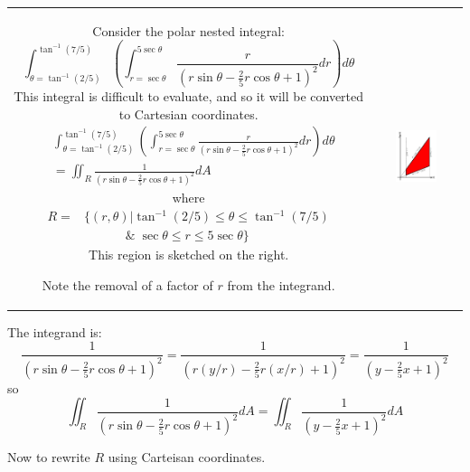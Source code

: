 \documentclass{article}
\begin{document}
\begin{tabular}{cc}
\parbox{0.5\textwidth}{
Consider the polar nested integral:
\[\int_{\theta = \tan^{-1}(2/5)}^{\tan^{-1}(7/5)} \left(\int_{r = \sec\theta}^{5\sec\theta} \frac{r}{(r\sin\theta - \frac{2}{5}r\cos\theta + 1)^2} dr\right)d\theta\] 
This integral is difficult to evaluate, and so it will be converted to Cartesian coordinates. 
\begin{align*}
& \int_{\theta = \tan^{-1}(2/5)}^{\tan^{-1}(7/5)} \left(\int_{r = \sec\theta}^{5\sec\theta} \frac{r}{(r\sin\theta - \frac{2}{5}r\cos\theta + 1)^2} dr\right)d\theta \\
& = \iint_R \frac{1}{(r\sin\theta - \frac{2}{5}r\cos\theta + 1)^2} dA
\end{align*} 
where 
\begin{align*}  
R = & \Big\{(r,\theta) \Big| \tan^{-1}(2/5) \leq \theta \leq \tan^{-1}(7/5) \\
& \quad\quad\quad\;\&\; \sec\theta \leq r \leq 5\sec\theta \Big\}
\end{align*}  
This region is sketched on the right. 

Note the removal of a factor of \(r\) from the integrand.
} & \parbox{0.5\textwidth}{
\includegraphics[width = 0.5\textwidth]{Polar_region_6}
}
\end{tabular}

The integrand is:
\[\frac{1}{(r\sin\theta - \frac{2}{5}r\cos\theta + 1)^2} = \frac{1}{(r(y/r) - \frac{2}{5}r(x/r) + 1)^2} = \frac{1}{(y - \frac{2}{5}x + 1)^2}\]
so
\[\iint_R \frac{1}{(r\sin\theta - \frac{2}{5}r\cos\theta + 1)^2} dA = \iint_R \frac{1}{(y - \frac{2}{5}x + 1)^2} dA\]

Now to rewrite \(R\) using Carteisan coordinates. 
\end{document}
